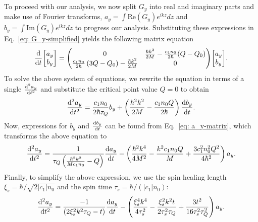 To proceed with our analysis, we now split \(G_y\) into real and imaginary parts
and make use of Fourier transforms, \(a_y=\int \text{Re}(G_y)e^{ikz} dz\) and
\(b_y=\int \text{Im}(G_y)e^{ikz} dz\) to progress our analysis.
Substituting these expressions in Eq.~\eqref{eq: G_y-simplified} yields the
following matrix equation
\begin{align}\label{eq: a_y-matrix}
    \dv{t}\mqty[a_y \\ b_y] = \mqty(0 & \frac{\hbar k^2}{2M}
    - \frac{c_1  n_0}{2\hbar}(Q - Q_0) \\
    \frac{c_1  n_0}{2\hbar} \left( 3Q-Q_0 \right)-\frac{\hbar k^2}{2M} & 0)
    \mqty[a_y \\ b_y].
 \end{align}
To solve the above system of equations, we rewrite the equation in terms of a
single \(\dv[2]{a_y}{t}\) and substitute the critical point value \(Q=0\) to
obtain
\begin{align}
    \dv[2]{a_y}{t} = \frac{c_1n_0}{2\hbar\tau_Q}b_y
    + \left(\frac{\hbar^2k^2}{2M} - \frac{c_1n_0Q}{2\hbar}\right)\dv{b_y}{t}.
\end{align}
Now, expressions for \(b_y\) and \(\dv{b_y}{t}\) can be found from
Eq.~\eqref{eq: a_y-matrix}, which transforms the above equation to
\begin{align}
    \dv[2]{a_y}{t} = \frac{1}{\tau_Q\left(\frac{\hbar^2k^2}{Mc_1n_0}
    - Q\right)}\dv{a_y}{t}
    - \left(\frac{\hbar^2k^4}{4M^2} - \frac{k^2c_1n_0Q}{M}
    + \frac{3c_1^2n_0^2Q^2}{4\hbar^2}\right)a_y.
\end{align}
Finally, to simplify the above expression, we use the spin healing length
\(\xi_s = \hbar/\sqrt{2|c_1|n_0}\) and the spin time
\(\tau_s=\hbar/(|c_1|n_0)\):
\begin{align}
  \dv[2]{a_y}{t} = \frac{-1}{\left(2\xi_s^2 k^2 \tau_Q- t \right)}\dv{a_y}{t}
  -\left( \frac{\xi_s^4 k^4}{4\tau_s^2} -\frac{\xi_s^2 k^2 t}{2\tau_s^2 \tau_Q}
  + \frac{3 t^2}{16\tau_s^2 \tau_Q^2} \right) a_y.
\end{align}


